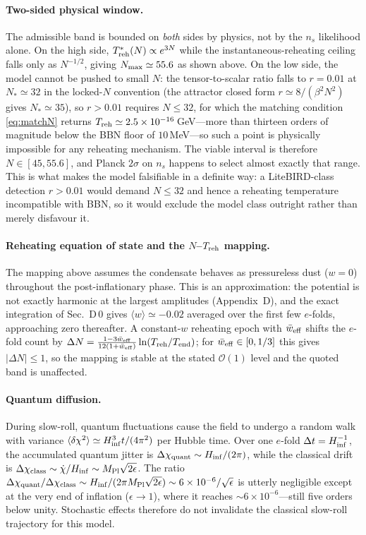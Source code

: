 \documentclass[pdflatex,sn-mathphys-num]{sn-jnl}
\providecommand{\lesssim}{\leq}
\newcommand{\MP}{M_{\rm Pl}}
\theoremstyle{thmstyleone}
\begin{document}
\paragraph{Two-sided physical window.} The admissible band is bounded on \emph{both} sides by physics, not by the $n_s$ likelihood alone. On the high side, $T^*_{\rm reh}(N)\propto e^{3N}$ while the instantaneous-reheating ceiling falls only as $N^{-1/2}$, giving $N_{\rm max}\simeq55.6$ as shown above. On the low side, the model cannot be pushed to small $N$: the tensor-to-scalar ratio falls to $r=0.01$ at $N_*\simeq32$ in the locked-$N$ convention (the attractor closed form $r\simeq8/(\beta^2N^2)$ gives $N_*\simeq35$), so $r>0.01$ requires $N\lesssim32$, for which the matching condition \eqref{eq:matchN} returns $T_{\rm reh}\simeq2.5\times10^{-16}\,$GeV---more than thirteen orders of magnitude below the BBN floor of $10\,$MeV---so such a point is physically impossible for any reheating mechanism. The viable interval is therefore $N\in[45,55.6]$, and Planck $2\sigma$ on $n_s$ happens to select almost exactly that range. This is what makes the model falsifiable in a definite way: a LiteBIRD-class detection $r>0.01$ would demand $N\lesssim32$ and hence a reheating temperature incompatible with BBN, so it would exclude the model class outright rather than merely disfavour it.

\paragraph{Reheating equation of state and the $N$--$T_{\rm reh}$ mapping.} The mapping above assumes the condensate behaves as pressureless dust ($w=0$) throughout the post-inflationary phase. This is an approximation: the potential is not exactly harmonic at the largest amplitudes (Appendix~D), and the exact integration of Sec.~D\,0 gives $\langle w\rangle\simeq-0.02$ averaged over the first few $e$-folds, approaching zero thereafter. A constant-$w$ reheating epoch with $\bar w_{\rm eff}$ shifts the $e$-fold count by $\Delta N=\frac{1-3\bar w_{\rm eff}}{12(1+\bar w_{\rm eff})}\ln(T_{\rm reh}/T_{\rm end})$; for $\bar w_{\rm eff}\in[0,1/3]$ this gives $|\Delta N|\lesssim1$, so the mapping is stable at the stated $\mathcal{O}(1)$ level and the quoted band is unaffected.

\paragraph{Quantum diffusion.} During slow-roll, quantum fluctuations cause the field to undergo a random walk with variance $\langle\delta\chi^2\rangle\simeq H_{\rm inf}^3 t/(4\pi^2)$ per Hubble time. Over one $e$-fold $\Delta t=H_{\rm inf}^{-1}$, the accumulated quantum jitter is $\Delta\chi_{\rm quant}\sim H_{\rm inf}/(2\pi)$, while the classical drift is $\Delta\chi_{\rm class}\sim\dot\chi/H_{\rm inf}\sim\MP\sqrt{2\epsilon}$. The ratio $\Delta\chi_{\rm quant}/\Delta\chi_{\rm class}\sim H_{\rm inf}/(2\pi\MP\sqrt{2\epsilon})\sim6\times10^{-6}/\sqrt{\epsilon}$ is utterly negligible except at the very end of inflation ($\epsilon\to1$), where it reaches $\sim6\times10^{-6}$---still five orders below unity. Stochastic effects therefore do not invalidate the classical slow-roll trajectory for this model.
\end{document}
